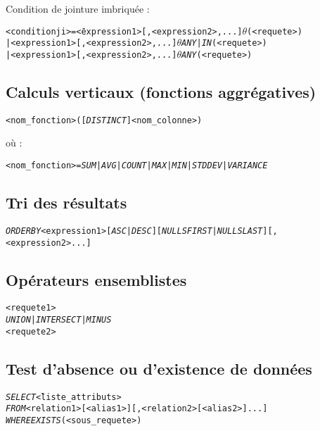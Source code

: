 \documentclass[10pt]{article}
\begin{document}
			Condition de jointure imbriquée :
			\begin{alltt}
				\begin{tabbing}
					<conditionji> = \= <expression1>[, <expression2>,...] \(\theta\) (<requete>)\\
									\> | <expression1>[, <expression2>,...] \(\theta\) \emph{ANY} | \emph{IN} (<requete>)\\
									\> | <expression1>[, <expression2>,...] \(\theta\) \emph{ANY} (<requete>)
				\end{tabbing}
			\end{alltt}
			
		\subsection{Calculs verticaux (fonctions aggrégatives)}
			\begin{alltt}
				<nom_fonction> ([\emph{DISTINCT}] <nom_colonne>)
			\end{alltt}
			où :
			\begin{alltt}
				<nom_fonction> = \emph{SUM} | \emph{AVG} | \emph{COUNT} | \emph{MAX} | \emph{MIN} | \emph{STDDEV} | \emph{VARIANCE}
			\end{alltt}
			
		\subsection{Tri des résultats}
			\begin{alltt}
				\emph{ORDER BY} <expression1> [\emph{ASC} | \emph{DESC}] [\emph{NULLS FIRST} | \emph{NULLS LAST}] [,<expression2> ...]
			\end{alltt}
			
		\subsection{Opérateurs ensemblistes}
			\begin{alltt}
				<requete1>
				\emph{UNION} | \emph{INTERSECT} | \emph{MINUS}
				<requete2>
			\end{alltt}
			
		\subsection{Test d'absence ou d'existence de données}
			\begin{alltt}
				\begin{tabbing}
					\emph{SELECT} \= <liste_attributs>\\
					\emph{FROM}   \> <relation1> [<alias1>] [,<relation2> [<alias2>] ...]\\
					\emph{WHERE}  \emph{EXISTS} (<sous_requete>)
				\end{tabbing}
			\end{alltt}
			
\end{document}
